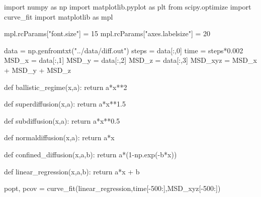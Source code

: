 \documentclass[
  letterpaper,
  DIV=11,
  numbers=noendperiod]{scrreprt}
\newenvironment{Shaded}{\begin{snugshade}}{\end{snugshade}}
\newcommand{\ControlFlowTok}[1]{\textcolor[rgb]{0.00,0.23,0.31}{#1}}
\newcommand{\DecValTok}[1]{\textcolor[rgb]{0.68,0.00,0.00}{#1}}
\newcommand{\FloatTok}[1]{\textcolor[rgb]{0.68,0.00,0.00}{#1}}
\newcommand{\ImportTok}[1]{\textcolor[rgb]{0.00,0.46,0.62}{#1}}
\newcommand{\KeywordTok}[1]{\textcolor[rgb]{0.00,0.23,0.31}{#1}}
\newcommand{\NormalTok}[1]{\textcolor[rgb]{0.00,0.23,0.31}{#1}}
\newcommand{\OperatorTok}[1]{\textcolor[rgb]{0.37,0.37,0.37}{#1}}
\newcommand{\StringTok}[1]{\textcolor[rgb]{0.13,0.47,0.30}{#1}}
\begin{document}
\begin{Shaded}
\begin{Highlighting}[]
\ImportTok{import}\NormalTok{ numpy }\ImportTok{as}\NormalTok{ np}
\ImportTok{import}\NormalTok{ matplotlib.pyplot }\ImportTok{as}\NormalTok{ plt}
\ImportTok{from}\NormalTok{ scipy.optimize }\ImportTok{import}\NormalTok{ curve\_fit}
\ImportTok{import}\NormalTok{ matplotlib }\ImportTok{as}\NormalTok{ mpl}

\NormalTok{mpl.rcParams[}\StringTok{"font.size"}\NormalTok{] }\OperatorTok{=} \DecValTok{15}
\NormalTok{mpl.rcParams[}\StringTok{"axes.labelsize"}\NormalTok{] }\OperatorTok{=} \DecValTok{20}

\NormalTok{data }\OperatorTok{=}\NormalTok{ np.genfromtxt(}\StringTok{"../data/diff.out"}\NormalTok{)}
\NormalTok{steps }\OperatorTok{=}\NormalTok{ data[:,}\DecValTok{0}\NormalTok{]}
\NormalTok{time }\OperatorTok{=}\NormalTok{ steps}\OperatorTok{*}\FloatTok{0.002}
\NormalTok{MSD\_x }\OperatorTok{=}\NormalTok{ data[:,}\DecValTok{1}\NormalTok{]}
\NormalTok{MSD\_y }\OperatorTok{=}\NormalTok{ data[:,}\DecValTok{2}\NormalTok{]}
\NormalTok{MSD\_z }\OperatorTok{=}\NormalTok{ data[:,}\DecValTok{3}\NormalTok{]}
\NormalTok{MSD\_xyz }\OperatorTok{=}\NormalTok{ MSD\_x }\OperatorTok{+}\NormalTok{ MSD\_y }\OperatorTok{+}\NormalTok{ MSD\_z}

\KeywordTok{def}\NormalTok{ ballistic\_regime(x,a):}
  \ControlFlowTok{return}\NormalTok{ a}\OperatorTok{*}\NormalTok{x}\OperatorTok{**}\DecValTok{2}

\KeywordTok{def}\NormalTok{ superdiffusion(x,a):}
  \ControlFlowTok{return}\NormalTok{ a}\OperatorTok{*}\NormalTok{x}\OperatorTok{**}\FloatTok{1.5}

\KeywordTok{def}\NormalTok{ subdiffusion(x,a):}
  \ControlFlowTok{return}\NormalTok{ a}\OperatorTok{*}\NormalTok{x}\OperatorTok{**}\FloatTok{0.5}

\KeywordTok{def}\NormalTok{ normaldiffusion(x,a):}
  \ControlFlowTok{return}\NormalTok{ a}\OperatorTok{*}\NormalTok{x}

\KeywordTok{def}\NormalTok{ confined\_diffusion(x,a,b):}
  \ControlFlowTok{return}\NormalTok{ a}\OperatorTok{*}\NormalTok{(}\DecValTok{1}\OperatorTok{{-}}\NormalTok{np.exp(}\OperatorTok{{-}}\NormalTok{b}\OperatorTok{*}\NormalTok{x))}

\KeywordTok{def}\NormalTok{ linear\_regression(x,a,b):}
  \ControlFlowTok{return}\NormalTok{ a}\OperatorTok{*}\NormalTok{x }\OperatorTok{+}\NormalTok{ b}

\NormalTok{popt, pcov }\OperatorTok{=}\NormalTok{ curve\_fit(linear\_regression,time[}\OperatorTok{{-}}\DecValTok{500}\NormalTok{:],MSD\_xyz[}\OperatorTok{{-}}\DecValTok{500}\NormalTok{:])}


\end{Highlighting}
\end{Shaded}
\end{document}
